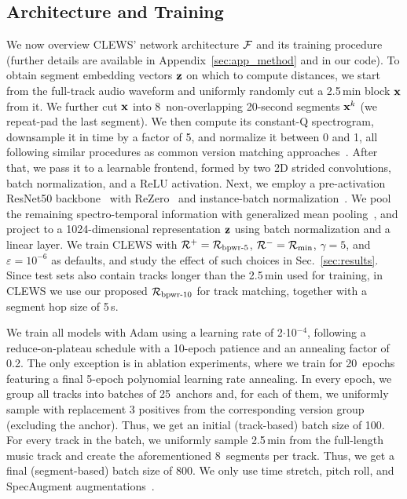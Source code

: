\subsection{Architecture and Training}
\label{sec:method_model}

We now overview CLEWS' network architecture $\mathcal{F}$ and its training procedure (further details are available in Appendix~\ref{sec:app_method} and in our code). To obtain segment embedding vectors $\textbf{z}$ on which to compute distances, we start from the full-track audio waveform and uniformly randomly cut a 2.5\,min block $\textbf{x}$ from it. We further cut $\textbf{x}$ into 8~non-overlapping 20-second segments $\textbf{x}^k$ (we repeat-pad the last segment). We then compute its constant-Q spectrogram, downsample it in time by a factor of 5, and normalize it between 0 and 1, all following similar procedures as common version matching approaches~\cite{yesiler_audio-based_2021}. After that, we pass it to a learnable frontend, formed by two 2D strided convolutions, batch normalization, and a ReLU activation. Next, we employ a pre-activation ResNet50 backbone~\cite{he_identity_2016} with ReZero~\cite{bachlechner_rezero_2021} and instance-batch normalization~\cite{pan_two_2018}. We pool the remaining spectro-temporal information with generalized mean pooling~\cite{radenovic_fine-tuning_2019}, and project to a 1024-dimensional representation $\textbf{z}$ using batch normalization and a linear layer. We train CLEWS with $\mathcal{R}^+=\mathcal{R}_{\text{bpwr-5}}$, $\mathcal{R}^-=\mathcal{R}_{\text{min}}$, $\gamma=5$, and $\varepsilon=10^{-6}$ as defaults, and study the effect of such choices in Sec.~\ref{sec:results}. Since test sets also contain tracks longer than the 2.5\,min used for training, in CLEWS we use our proposed $\mathcal{R}_{\text{bpwr-10}}$ for track matching, together with a segment hop size of 5\,s.

We train all models with Adam using a learning rate of 2$\cdot$10$^{-4}$, following a reduce-on-plateau schedule with a 10-epoch patience and an annealing factor of 0.2. The only exception is in ablation experiments, where we train for 20~epochs featuring a final 5-epoch polynomial learning rate annealing. In every epoch, we group all tracks into batches of 25~anchors and, for each of them, we uniformly sample with replacement 3 positives from the corresponding version group (excluding the anchor). Thus, we get an initial (track-based) batch size of 100. For every track in the batch, we uniformly sample 2.5\,min from the full-length music track and create the aforementioned 8~segments per track. Thus, we get a final (segment-based) batch size of 800. We only use time stretch, pitch roll, and SpecAugment augmentations~\cite{liu_coverhunter_2023}.

